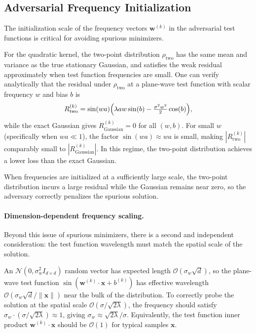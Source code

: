 \documentclass[12pt]{article}
\newcommand{\bx}{\mathbf{x}}
\newcommand{\bw}{\mathbf{w}}
\theoremstyle{plain}
\begin{document}
\subsection{Adversarial Frequency Initialization}
\label{sec:freqinit}

The initialization scale of the frequency vectors $\bw^{(k)}$ in the adversarial test
functions is critical for avoiding spurious minimizers.

For the quadratic kernel, the two-point distribution $\rho_\mathrm{two}$ has the same
mean and variance as the true stationary Gaussian, and satisfies the weak residual
approximately when test function frequencies are small. One can verify analytically
that the residual under $\rho_\mathrm{two}$ at a plane-wave test function with scalar
frequency $w$ and bias $b$ is
\begin{equation}
  R^{(k)}_\mathrm{two} = \sin(wa)\Bigl(\lambda a w\sin(b) - \tfrac{\sigma^2 w^2}{2}\cos(b)\Bigr),
  \label{eq:res_twopoint}
\end{equation}
while the exact Gaussian gives $R^{(k)}_\mathrm{Gaussian}=0$ for all $(w,b)$. For small
$w$ (specifically when $wa\ll 1$), the factor $\sin(wa)\approx wa$ is small, making
$|R^{(k)}_\mathrm{two}|$ comparably small to $|R^{(k)}_\mathrm{Gaussian}|$. In this
regime, the two-point distribution achieves a lower loss than the exact Gaussian.

When frequencies are initialized at a sufficiently large scale, the two-point distribution
incurs a large residual while the Gaussian remains near zero, so the adversary correctly
penalizes the spurious solution.

\paragraph{Dimension-dependent frequency scaling.}
Beyond this issue of spurious minimizers, there is a second and independent consideration:
the test function wavelength must match the spatial scale of the solution.

An $\mathcal{N}(0,\sigma_w^2 I_{d\times d})$ random vector has expected length
$\mathcal{O}(\sigma_w\sqrt{d})$, so the plane-wave test function
$\sin(\bw^{(k)}\cdot\bx+b^{(k)})$ has effective wavelength $\mathcal{O}(\sigma_w\sqrt{d}/\|\bx\|)$
near the bulk of the distribution. To correctly probe the solution at the spatial scale
$\mathcal{O}(\sigma/\sqrt{2\lambda})$, the frequency should satisfy
$\sigma_w\cdot(\sigma/\sqrt{2\lambda})\approx 1$, giving $\sigma_w\approx\sqrt{2\lambda}/\sigma$.
Equivalently, the test function inner product $\bw^{(k)}\cdot\bx$ should be
$\mathcal{O}(1)$ for typical samples $\bx$.
\end{document}
